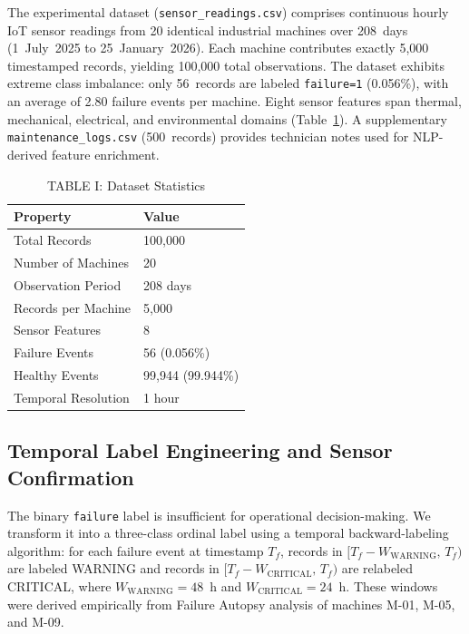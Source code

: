 \documentclass[conference]{IEEEtran}
\begin{document}
The experimental dataset (\texttt{sensor\_readings.csv}) comprises continuous
hourly IoT sensor readings from 20 identical industrial machines over 208~days
(1~July~2025 to 25~January~2026). Each machine contributes exactly 5,000
timestamped records, yielding 100,000 total observations. The dataset exhibits
extreme class imbalance: only 56~records are labeled \texttt{failure=1}
(0.056\%), with an average of 2.80 failure events per machine. Eight sensor
features span thermal, mechanical, electrical, and environmental domains
(Table~\ref{tab:dataset_stats}). A supplementary
\texttt{maintenance\_logs.csv} (500~records) provides technician notes used
for NLP-derived feature enrichment.

\begin{table}[htbp]
\caption{TABLE I: Dataset Statistics}
\centering
\begin{tabular}{ll}
\hline
\textbf{Property} & \textbf{Value} \\
\hline
Total Records          & 100,000 \\
Number of Machines     & 20 \\
Observation Period     & 208 days \\
Records per Machine    & 5,000 \\
Sensor Features        & 8 \\
Failure Events         & 56 (0.056\%) \\
Healthy Events         & 99,944 (99.944\%) \\
Temporal Resolution    & 1 hour \\
\hline
\end{tabular}
\label{tab:dataset_stats}
\end{table}

\subsection{Temporal Label Engineering and Sensor Confirmation}

The binary \texttt{failure} label is insufficient for operational
decision-making. We transform it into a three-class ordinal label using a
temporal backward-labeling algorithm: for each failure event at timestamp
$T_f$, records in $[T_f - W_{\text{WARNING}},\,T_f)$ are labeled WARNING and
records in $[T_f - W_{\text{CRITICAL}},\,T_f)$ are relabeled CRITICAL, where
$W_{\text{WARNING}} = 48$~h and $W_{\text{CRITICAL}} = 24$~h. These windows
were derived empirically from Failure Autopsy analysis of machines M-01,
M-05, and M-09.
\end{document}
